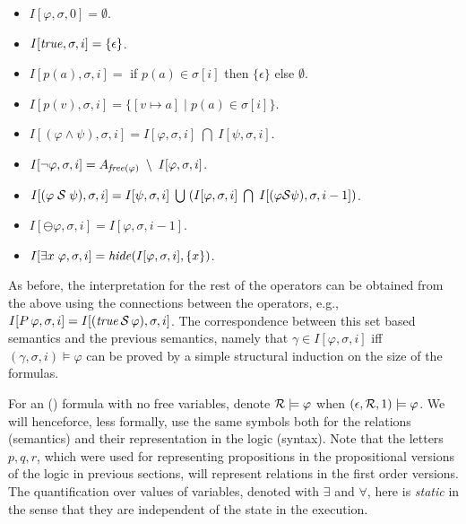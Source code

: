 \begin{itemize}
\item $I [ \varphi , \sigma , 0 ] = \emptyset$.
\item $I [ \mathit{true} , \sigma , i ] = \{ \epsilon \}$.
\item $I [ p ( a ) , \sigma , i ] =$ if $p ( a ) \in \sigma [ i ]$ then
$\{ \epsilon \}$ else $\emptyset$.
\item $I [ p ( v ) , \sigma , i ] = \{ [ v \mapsto a ] \; | \; p ( a ) \in
\sigma [ i ] \}$.
\item $I [ ( \varphi \wedge \psi ) , \sigma , i ] = 
I [ \varphi , \sigma , i ] \;  \bigcap \; I [ \psi , \sigma , i ]$.
\item $I [ \neg \varphi , \sigma , i ] = 
A_{\mathit{free} ( \varphi )} \; \setminus \; I [ \varphi , \sigma , i ]$.
\item $I [ ( \varphi \; {\cal S} \; \psi ) , \sigma , i ] = 
I [ \psi , \sigma , i ] \; \bigcup \;
( I [ \varphi , \sigma , i ] \; \bigcap \; 
I [ (\varphi {\cal S} \psi ) , \sigma , i - 1 ] )$.
\item $I [ \ominus \varphi , \sigma , i ] = I [ \varphi , \sigma , i-1 ]$.
\item $I [ \exists x \; \varphi , \sigma , i ] = 
\mathit{hide} ( I [ \varphi , \sigma , i ] , \{ x \} )$.
\end{itemize}

\noindent
As before, the interpretation for the rest of the operators can
be obtained from the above using the connections between the operators,
e.g., $I [ P \, \varphi  , \sigma , i ] = 
I [ ( \mathit{true} \, {\cal S} \, \varphi ) , \sigma , i ]$.
The correspondence between this set based semantics 
and the previous semantics, namely that
$\gamma \in I [ \varphi , \sigma, i ]$ iff
$( \gamma , \sigma , i ) \models \varphi$
can be proved by a simple structural induction on
the size of the formulas.
 \fi

For an \FLTL{} (\PFLTL{}) formula with no free variables, denote ${\cal R} \models \varphi$ when $( \epsilon , {\cal R} , 1 ) \models \varphi$.
We will henceforce, less formally, use the same
symbols both for the relations (semantics) and their representation in
the logic (syntax).
Note that the letters $p, q, r$, which were
used for representing propositions in the propositional versions
of the logic in previous sections, will represent relations in
the first order versions.
The quantification over values of variables, 
denoted with $\exists$ and
$\forall$,
here is {\em static} in the sense that they are independent of the state in the execution. 


